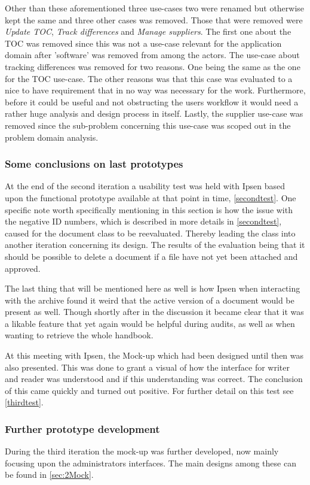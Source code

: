 Other than these aforementioned three use-cases two were renamed but otherwise kept the same and three other cases was removed.
Those that were removed were \textit{Update TOC}, \textit{Track differences} and \textit{Manage suppliers}.
The first one about the TOC was removed since this was not a use-case relevant for the application domain after 'software' was removed from among the actors.
The use-case about tracking differences was removed for two reasons.
One being the same as the one for the TOC use-case.
The other reasons was that this case was evaluated to a nice to have requirement that in no way was necessary for the work.
Furthermore, before it could be useful and not obstructing the users workflow it would need a rather huge analysis and design process in itself.
Lastly, the supplier use-case was removed since the sub-problem concerning this use-case was scoped out in the problem domain analysis.

\subsubsection*{Some conclusions on last prototypes}
At the end of the second iteration a usability test was held with Ipsen based upon the functional prototype available at that point in time, \cref{secondtest}.
One specific note worth specifically mentioning in this section is how the issue with the negative ID numbers, which is described in more details in \cref{secondtest}, caused for the document class to be reevaluated.
Thereby leading the class into another iteration concerning its design.
The results of the evaluation being that it should be possible to delete a document if a file have not yet been attached and approved.

The last thing that will be mentioned here as well is how Ipsen when interacting with the archive found it weird that the active version of a document would be present as well.
Though shortly after in the discussion it became clear that it was a likable feature that yet again would be helpful during audits, as well as when wanting to retrieve the whole handbook.

At this meeting with Ipsen, the Mock-up which had been designed until then was also presented.
This was done  to grant a visual of how the interface for writer and reader was understood and if this understanding was correct.
The conclusion of this came quickly and turned out positive.
For further detail on this test see \cref{thirdtest}.


\subsubsection*{Further prototype development}
During the third iteration the mock-up was further developed, now mainly focusing upon the administrators interfaces.
The main designs among these can be found in \cref{sec:2Mock}.

